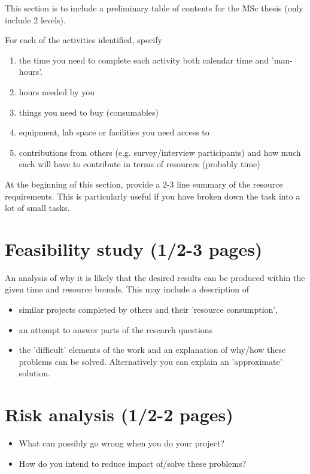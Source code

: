\documentclass[informationsecurity]{gucmasterproject}
\begin{document}
This section is to include a preliminary table of contents for the MSc thesis
(only include 2 levels).

For each of the activities identified, specify
\begin{enumerate}
\item  the time you need to complete each activity both calendar time and 'man-hours'.
\item  hours needed by you
\item  things you need to buy (consumables)
\item  equipment, lab space or facilities you need access to
\item  contributions from others (e.g. survey/interview participants) and how much each will have to contribute in terms of resources (probably time)
\end{enumerate}
At the beginning of this section, provide a 2-3 line summary of the
resource requirements.  This is particularly useful if you have broken
down the task into a lot of small tasks.

\chapter{Feasibility study (1/2-3 pages)}
An analysis of why it is likely that the desired
results can be produced within the given time and
resource bounds.  This may include a description of
\begin{itemize}
\item similar projects completed by others and their 'resource consumption',
\item an attempt to answer parts of the research questions
\item the 'difficult' elements of the work and an explanation of why/how these problems can be solved.  
Alternatively you can explain an 'approximate' solution.
\end{itemize}

\chapter{Risk analysis (1/2-2 pages)}
\begin{itemize}
\item What can possibly go wrong when you do your project?
\item How do you intend to reduce impact of/solve these problems?
\end{itemize}
\end{document}

